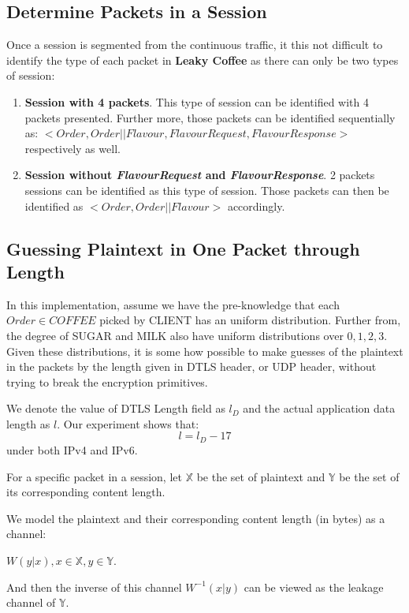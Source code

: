 \subsection{Determine Packets in a Session}
Once a session is segmented from the continuous traffic, it this not difficult to identify the type of each packet in \textbf{Leaky Coffee} as there can only be two types of session:
\begin{enumerate}
\item \textbf{Session with 4 packets}. This type of session can be identified with 4 packets presented. Further more, those packets can be identified sequentially as: $<Order, Order||Flavour, FlavourRequest, FlavourResponse>$ respectively as well.

\item \textbf{Session without \textit{FlavourRequest} and \textit{FlavourResponse}}. 2 packets sessions can be identified as this type of session. Those packets can then be identified as $<Order, Order||Flavour>$ accordingly.
\end{enumerate}
 
\subsection{Guessing Plaintext in  One Packet through Length} \label{Sec: Guessing Plaintext by One Packet Length}
In this implementation, assume we have the pre-knowledge that each $Order \in COFFEE$ picked by CLIENT has an uniform distribution. Further from, the degree of SUGAR and MILK also have uniform distributions over ${0,1,2,3}$. Given these distributions, it is some how possible to make guesses of the plaintext in the packets by the length given in DTLS header, or UDP header, without trying to break the encryption primitives.

We denote the value of DTLS Length field as $l_D$ and the actual application data length as $l$. Our experiment shows that:
\begin{equation}
l = l_D - 17 \label{Eq: Plaintext length}
\end{equation}
under both IPv4 and IPv6.

\begin{definition}
For a specific packet in a session, let $\mathbb{X}$ be the set of plaintext and $\mathbb{Y}$ be the set of its corresponding content length.

 We model the plaintext  and their corresponding content length (in bytes) as a channel: 
 \begin{center}
 $W(y|x), x \in \mathbb{X}, y \in \mathbb{Y}$.
 \end{center}

And then the inverse of this channel $W^{-1}(x|y)$ can be viewed as the leakage channel of $\mathbb{Y}$.
\end{definition}

